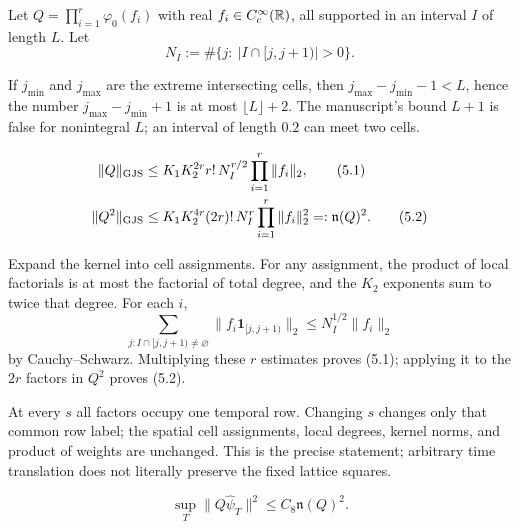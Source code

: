 \documentclass[11pt,a4paper]{article}
\begin{document}
\QedStep


Let
$Q=\prod_{i=1}^r\varphi_0(f_i)$ with real $f_i\in C_c^\infty(\mathbb R)$, all supported
in an interval $I$ of length $L$.  Let
\[
 N_I:=\#\{j:\ |I\cap[j,j+1)|>0\}.
\]


\Because If $j_{\min}$ and $j_{\max}$ are the extreme intersecting cells, then
$j_{\max}-j_{\min}-1<L$, hence the number
$j_{\max}-j_{\min}+1$ is at most $\lfloor L\rfloor+2$.  The manuscript's bound
$L+1$ is false for nonintegral $L$; an interval of length $0.2$ can meet two cells.

\begin{align}
 \|Q\|_{\rm GJS}
 &\leq K_1K_2^{2r}r!\,N_I^{r/2}\prod_{i=1}^r\|f_i\|_2,             \tag{5.1}\\
 \|Q^2\|_{\rm GJS}
 &\leq K_1K_2^{4r}(2r)!\,N_I^r\prod_{i=1}^r\|f_i\|_2^2
   =:\mathfrak n(Q)^2.                                             \tag{5.2}
\end{align}

\Because Expand the kernel into cell assignments.  For any assignment, the product
of local factorials is at most the factorial of total degree, and the $K_2$ exponents
sum to twice that degree.  For each $i$,
\[
 \sum_{j:I\cap[j,j+1)\ne\varnothing}\|f_i\mathbf1_{[j,j+1)}\|_2
 \leq N_I^{1/2}\|f_i\|_2
\]
by Cauchy--Schwarz.  Multiplying these $r$ estimates proves (5.1); applying it to
the $2r$ factors in $Q^2$ proves (5.2).


\Because At every $s$ all factors occupy one temporal row.  Changing $s$ changes
only that common row label; the spatial cell assignments, local degrees, kernel norms,
and product of weights are unchanged.  This is the precise statement; arbitrary time
translation does not literally preserve the fixed lattice squares.

\QedStep


\[
 \sup_T\|Q\widehat\psi_T\|^2\leq C_8\mathfrak n(Q)^2.              \tag{6.1}
\]
\end{document}
